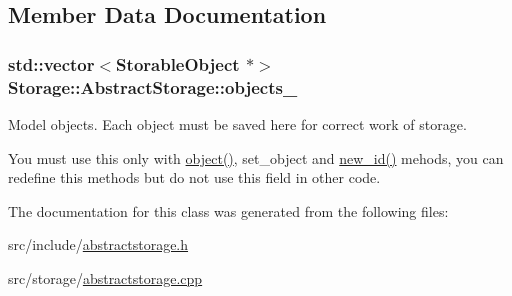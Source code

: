 \subsection{Member Data Documentation}
\hypertarget{classStorage_1_1AbstractStorage_a54758736009f559baf85a2d477b4d370}{
\subsubsection[{objects\_\-}]{\setlength{\rightskip}{0pt plus 5cm}std::vector$<${\bf StorableObject} $\ast$$>$ {\bf Storage::AbstractStorage::objects\_\-}}}
\label{d6/da0/classStorage_1_1AbstractStorage_a54758736009f559baf85a2d477b4d370}
Model objects. Each object must be saved here for correct work of storage.

You must use this only with \hyperlink{classStorage_1_1AbstractStorage_a21ff57c954664abb78d1d658a1da7afa}{object()}, set\_\-object and \hyperlink{classStorage_1_1AbstractStorage_ab9e323067a58b74a7d1c835f0d1832c8}{new\_\-id()} mehods, you can redefine this methods but do not use this field in other code. 

The documentation for this class was generated from the following files:\begin{DoxyCompactItemize}
\item 
src/include/\hyperlink{abstractstorage_8h}{abstractstorage.h}\item 
src/storage/\hyperlink{abstractstorage_8cpp}{abstractstorage.cpp}\end{DoxyCompactItemize}
